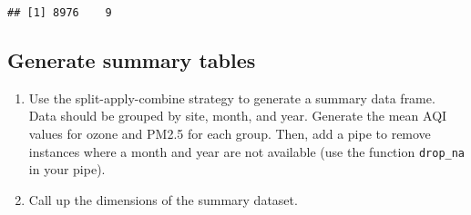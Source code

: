 \documentclass[]{article}
\newenvironment{Shaded}{\begin{snugshade}}{\end{snugshade}}
\newcommand{\CommentTok}[1]{\textcolor[rgb]{0.56,0.35,0.01}{\textit{#1}}}
\newcommand{\DataTypeTok}[1]{\textcolor[rgb]{0.13,0.29,0.53}{#1}}
\newcommand{\FloatTok}[1]{\textcolor[rgb]{0.00,0.00,0.81}{#1}}
\newcommand{\KeywordTok}[1]{\textcolor[rgb]{0.13,0.29,0.53}{\textbf{#1}}}
\newcommand{\NormalTok}[1]{#1}
\newcommand{\OperatorTok}[1]{\textcolor[rgb]{0.81,0.36,0.00}{\textbf{#1}}}
\newcommand{\OtherTok}[1]{\textcolor[rgb]{0.56,0.35,0.01}{#1}}
\newcommand{\StringTok}[1]{\textcolor[rgb]{0.31,0.60,0.02}{#1}}
\begin{document}
\begin{verbatim}
## [1] 8976    9
\end{verbatim}

\begin{Shaded}
\end{Shaded}

\hypertarget{generate-summary-tables}{%
\subsection{Generate summary tables}\label{generate-summary-tables}}

\begin{enumerate}
\def\labelenumi{\arabic{enumi}.}
\setcounter{enumi}{11}
\item
  Use the split-apply-combine strategy to generate a summary data frame.
  Data should be grouped by site, month, and year. Generate the mean AQI
  values for ozone and PM2.5 for each group. Then, add a pipe to remove
  instances where a month and year are not available (use the function
  \texttt{drop\_na} in your pipe).
\item
  Call up the dimensions of the summary dataset.
\end{enumerate}

\begin{Shaded}
\end{Shaded}
\end{document}
